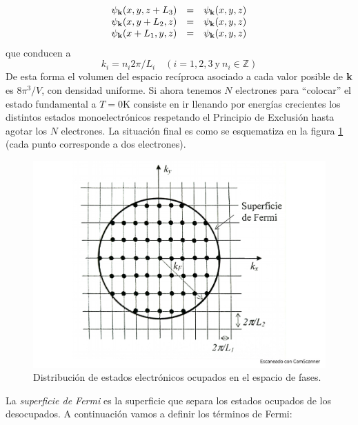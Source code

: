 \begin{equation}
    \begin{array}{ccc}
    \psi_{\mathbf{k}} (x,y,z+L_3) & = & \psi_{\mathbf{k}} (x,y,z) \\
    \psi_{\mathbf{k}} (x,y+L_2,z) & = & \psi_{\mathbf{k}} (x,y,z) \\
    \psi_{\mathbf{k}} (x+L_1,y,z) & = & \psi_{\mathbf{k}} (x,y,z) \\
    \end{array}
\end{equation}
que conducen a 
\begin{equation}
    k_i = n_i 2 \pi / L_i \quad (i=1,2,3 \ \text{y} \ n_i \in \mathbb{Z})
\end{equation}
De esta forma el volumen del espacio recíproca asociado a cada valor posible de $\mathbf{k}$ es $8\pi^3 /V$, con densidad uniforme. Si ahora tenemos $N$ electrones para ``colocar'' el estado fundamental a $T=0$K consiste en ir llenando por energías crecientes los distintos estados monoelectrónicos respetando el Principio de Exclusión hasta agotar los $N$ electrones. La situación final es como se esquematiza en la figura \ref{Fig:06-01} (cada punto corresponde a dos electrones).

\begin{figure}[h!] \centering
    \includegraphics[scale=0.35]{Cuerpo/Ch_06/Fotos libro 1.pdf}
    \caption{Distribución de estados electrónicos ocupados en el espacio de fases.}
    \label{Fig:06-01}
\end{figure}    

La \textit{superficie de Fermi} es la superficie que separa los estados ocupados de los desocupados. A continuación vamos a definir los términos de Fermi:

